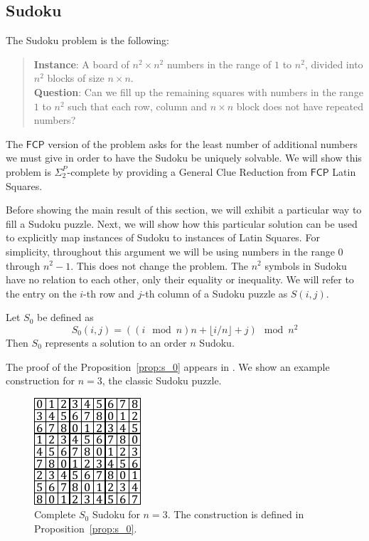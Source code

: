 \documentclass[runningheads,a4paper]{llncs}
\begin{document}
\subsection{Sudoku}

The Sudoku problem is the following: 

\begin{quote}
\textbf{Instance}: A board of $n^2 \times n^2$ numbers in the range of $1$ to $n^2$, divided into $n^2$ blocks of size $n \times n$.\\
\textbf{Question}: Can we fill up the remaining squares with numbers in the range $1$ to $n^2$ such that each row, column and $n \times n$ block does not have repeated numbers?
\end{quote}

The $\mathsf{FCP}$ version of the problem asks for the least number of additional numbers we must give in order to have the Sudoku be uniquely solvable. We will show this problem is $\Sigma_2^P$-complete by providing a General Clue Reduction from $\mathsf{FCP}$ Latin Squares. 

Before showing the main result of this section, we will exhibit a particular way to fill a Sudoku puzzle. Next, we will show how this particular solution can be used to explicitly map instances of Sudoku to instances of Latin Squares. For simplicity, throughout this argument we will be using numbers in the range $0$ through $n^2 - 1$. This does not change the problem. The $n^2$ symbols in Sudoku have no relation to each other, only their equality or inequality. We will refer to the entry on the $i$-th row and $j$-th column of a Sudoku puzzle as $S(i,j)$.

\begin{proposition}
\label{prop:s_0}
Let $S_0$ be defined as
\[ S_0 (i,j) = ((i \mod n) n + \lfloor i/n \rfloor + j) \mod n^2 \]
Then $S_0$ represents a solution to an order $n$ Sudoku.
\end{proposition}

The proof of the Proposition~\ref{prop:s_0} appears in \cite{takayaki2003complexity}. We show an example construction for $n=3$, the classic Sudoku puzzle.

\begin{figure}
\centering
\label{fig:s_0}
\includegraphics[width=0.6\linewidth]{sudoku_s_0.pdf}
\caption{Complete $S_0$ Sudoku for $n = 3$. The construction is defined in Proposition~\ref{prop:s_0}.}
\end{figure}
\end{document}
